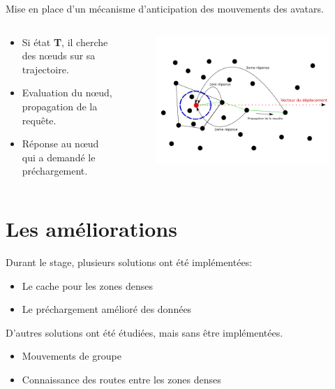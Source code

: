 \documentclass{beamer}
\begin{document}
  \begin{frame}
	Mise en place d'un mécanisme d'anticipation des mouvements des avatars.
	\begin{columns}
	  \begin{column}{5cm}
		\begin{itemize}
		  \item Si état \textbf{T}, il cherche des nœuds sur sa trajectoire.
		  \item Evaluation du nœud, propagation de la requête.
		  \item Réponse au nœud qui a demandé le préchargement.
		\end{itemize}
	  \end{column}
	\begin{column}{5cm}
	\begin{figure}
        \includegraphics[scale=0.3]{./Ressources/Images/propagation_algo.png}\\
        \label{Propa_Algo}
        \end{figure}
	\end{column}
	\end{columns}
  \end{frame}

  \section{Les améliorations}
  \begin{frame}
	Durant le stage, plusieurs solutions ont été implémentées:
	\begin{itemize}
		\pause\item Le cache pour les zones denses
		\pause\item Le préchargement amélioré des données
	\end{itemize}
	\pause D'autres solutions ont été étudiées, mais sans être implémentées.
	\begin{itemize}
		\item Mouvements de groupe
		\item Connaissance des routes entre les zones denses
	\end{itemize}
  \end{frame}
\end{document}
